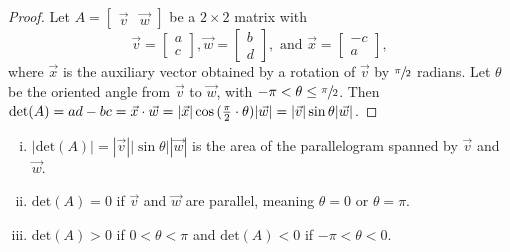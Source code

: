 \documentclass[a4paper,11pt]{article}
\begin{document}
\begin{outline}
    \begin{proof}
      Let \(A = \begin{bmatrix} \vec{v} & \vec{w} \end{bmatrix}\) be a \(2 \times 2\) matrix with 
      \[
        \vec{v} = \begin{bmatrix} a \\ c \end{bmatrix},
        \vec{w} = \begin{bmatrix} b \\ d \end{bmatrix}, \text{ and }
        \vec{x} = \begin{bmatrix} -c \\ a \end{bmatrix},
      \]
      where \(\vec{x}\) is the auxiliary vector obtained by a rotation of \(\vec{v}\) by \(\sfrac{\pi}{2}\) radians. 
      Let \(\theta\) be the oriented angle from \(\vec{v}\) to \(\vec{w}\), with \(-\pi < \theta \leq \sfrac{\pi}{2}\). 
      Then \(\text{det}(A) = ad-bc = \vec{x}\cdot\vec{w} = |\vec{x}|\cos{(\frac{\pi}{2} \cdot \theta)}|\vec{w}| 
      = |\vec{v}|\sin{\theta}|\vec{w}|\).
    \end{proof}

    \begin{enumerate}[i.]
      \item 
        \(|\text{det}(A)|=|\vec{v}||\sin{\theta}||\vec{w}|\) is the area of the parallelogram spanned by
        \(\vec{v}\) and \(\vec{w}\).
      \item 
        \(\text{det}(A) = 0\) if \(\vec{v}\) and \(\vec{w}\) are parallel, meaning \(\theta = 0\) or
        \(\theta = \pi\).
      \item
        \(\text{det}(A) > 0\) if \(0 < \theta < \pi\) and \(\text{det}(A) < 0\) if \(-\pi < \theta < 0\).
    \end{enumerate}
    
\end{outline}
      
\end{document}
